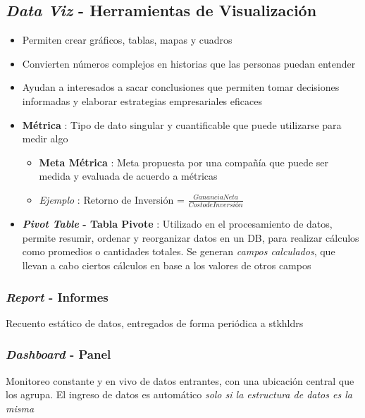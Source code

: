 \subsection{\textit{Data Viz} - Herramientas de Visualización}
\begin{itemize}
    \item {Permiten crear gráficos, tablas, mapas y cuadros}
    \item {Convierten números complejos en historias que las personas puedan entender}
    \item {Ayudan a interesados a sacar conclusiones que permiten tomar decisiones informadas y elaborar estrategias empresariales eficaces}
    \item {\textbf{Métrica} : Tipo de dato singular y cuantificable que puede utilizarse para medir algo
    \begin{itemize}
        \item {\textbf{Meta Métrica} : Meta propuesta por una compañía que puede ser medida y evaluada de acuerdo a métricas}
        \item {\textit{Ejemplo} : Retorno de Inversión = $\frac{Ganancia Neta}{Costo de Inversión}$}
    \end{itemize}}
    \item {\textbf{\textit{Pivot Table} - Tabla Pivote} : Utilizado en el procesamiento de datos, permite resumir, ordenar y reorganizar datos en un DB, para realizar cálculos como promedios o cantidades totales. Se generan \textit{campos calculados}, que llevan a cabo ciertos cálculos en base a los valores de otros campos}
\end{itemize}

\subsubsection{\textit{Report} - Informes}
Recuento estático de datos, entregados de forma periódica a \Gls{stkhldrs}

\subsubsection{\textit{Dashboard} - Panel}
Monitoreo constante y en vivo de datos entrantes, con una ubicación central que los agrupa. El ingreso de datos es automático \textit{solo si la estructura de datos es la misma}
